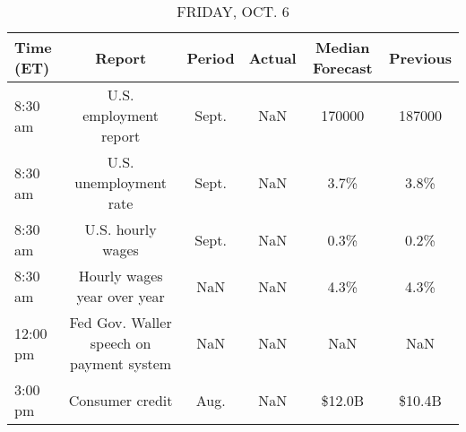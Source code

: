\documentclass{article}%
\begin{document}
%


\begin{table}[htbp]%
\caption{FRIDAY, OCT. 6}%
\centering%
\begin{adjustbox}{width=1\textwidth}%
\begin{tabular}{lccccc}
\toprule
Time (ET) &                                   Report & Period & Actual & Median Forecast & Previous \\
\midrule
  8:30 am &                   U.S. employment report &  Sept. &    NaN &          170000 &   187000 \\
  8:30 am &                   U.S. unemployment rate &  Sept. &    NaN &            3.7\% &     3.8\% \\
  8:30 am &                        U.S. hourly wages &  Sept. &    NaN &            0.3\% &     0.2\% \\
  8:30 am &              Hourly wages year over year &    NaN &    NaN &            4.3\% &     4.3\% \\
 12:00 pm & Fed Gov. Waller speech on payment system &    NaN &    NaN &             NaN &      NaN \\
  3:00 pm &                          Consumer credit &   Aug. &    NaN &          \$12.0B &   \$10.4B \\
\bottomrule
\end{tabular}
%
\end{adjustbox}%
\end{table}
\end{document}

